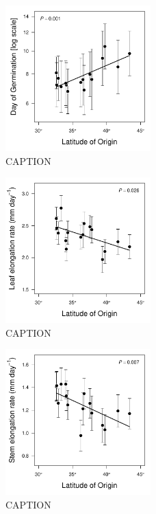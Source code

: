 \documentclass[11pt, oneside]{article}
\begin{document}

\begin{figure}[h!]
	\centerline{\includegraphics[width=0.5\textwidth]{Figures/Figure_DoG_Lat.pdf}}
	\fontsize{10}{12}
	\selectfont
	\caption[Southern populations germinate sooner.]{CAPTION}
	\label{fig:Fig_DoG}
\end{figure}

\begin{figure}[h!]
	\centerline{\includegraphics[width=0.5\textwidth]{Figures/Figure_LLL_Lat.pdf}}
	\fontsize{10}{12}
	\selectfont
	\caption[Southern populations grow faster (leaf expansion rate).]{CAPTION}
	\label{fig:Fig_LLL}
\end{figure}

\begin{figure}
	\centerline{\includegraphics[width=0.5\textwidth]{Figures/Figure_Height_Lat.pdf}}
	\fontsize{10}{12}
	\selectfont
	\caption[Southern populations grow faster (shoot elongation rate).]{CAPTION}
	\label{fig:Fig_height}
\end{figure}
\end{document}
